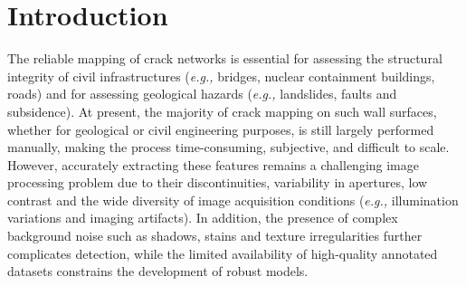 \documentclass[conference]{IEEEtran}
\newcommand{\eg}[0]{\textit{e.g., }}
\begin{document}
\section{Introduction}

{{T}{he} reliable mapping of crack networks is essential for assessing the structural integrity of civil infrastructures (\eg bridges, nuclear containment buildings, roads) and for assessing geological hazards (\eg landslides, faults and subsidence). At present, the majority of crack mapping on such wall surfaces, whether for geological or civil engineering purposes, is still largely performed manually, making the process time-consuming, subjective, and difficult to scale. However, accurately extracting these features remains a challenging image processing problem due to their discontinuities, variability in apertures, low contrast and the wide diversity of image acquisition conditions (\eg illumination variations and imaging artifacts). In addition, the presence of complex background noise such as shadows, stains and texture irregularities further complicates detection, while the limited availability of high-quality annotated datasets constrains the development of robust models.}







\end{document}
